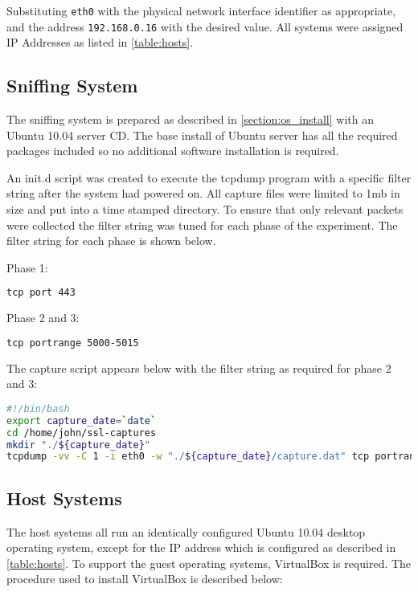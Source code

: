 Substituting \verb+eth0+ with the physical network interface identifier as
appropriate, and the address \verb+192.168.0.16+ with the desired value. All
systems were assigned IP Addresses as listed in \ref{table:hosts}.

\subsection{Sniffing System}

The sniffing system is prepared as described in \ref{section:os_install} with an
Ubuntu 10.04 server CD. The base install of Ubuntu server has all the required
packages included so no additional software installation is required.

An init.d script was created to execute the tcpdump program with a specific
filter string after the system had powered on. All capture files were limited to
1mb in size and put into a time stamped directory. To ensure that only relevant
packets were collected the filter string was tuned for each phase of the
experiment. The filter string for each phase is shown below.

Phase 1:
\begin{lstlisting}[language=sh]
tcp port 443
\end{lstlisting}

Phase 2 and 3:
\begin{lstlisting}[language=sh]
tcp portrange 5000-5015
\end{lstlisting}

The capture script appears below with the filter string as required for phase 2
and 3:

\begin{lstlisting}[language=sh]
#!/bin/bash
export capture_date=`date`
cd /home/john/ssl-captures
mkdir "./${capture_date}"
tcpdump -vv -C 1 -i eth0 -w "./${capture_date}/capture.dat" tcp portrange 5001-5015
\end{lstlisting}

\subsection{Host Systems}

The host systems all run an identically configured Ubuntu 10.04 desktop
operating system, except for the IP address which is configured as described in
\ref{table:hosts}. To support the guest operating systems, VirtualBox is
required. The procedure used to install VirtualBox is described below:

